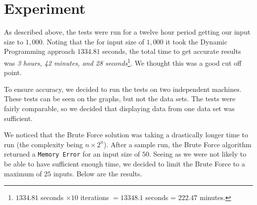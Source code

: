 \documentclass{article}
\begin{document}
\section{Experiment}
As described above, the tests were run for a twelve hour period getting our input size to $1,000$. Noting that the for input size of $1,000$ it took the Dynamic Programming approach $1334.81$ seconds, the total time to get accurate results was \textit{3 hours, 42 minutes, and 28 seconds}\footnote{$1334.81$ seconds $\times 10$ iterations $= 13348.1$ seconds = $222.47$ minutes.}. We thought this was a good cut off point.

To ensure accuracy, we decided to run the tests on two independent machines. These tests can be seen on the graphs, but not the data sets. The tests were fairly comparable, so we decided that displaying data from one data set was sufficient.

We noticed that the Brute Force solution was taking a drastically longer time to run (the complexity being $n \times 2^n$). After a sample run, the Brute Force algorithm returned a \texttt{Memory Error} for an input size of $50$. Seeing as we were not likely to be able to have sufficient enough time, we decided to limit the Brute Force to a maximum of $25$ inputs. Below are the results.
\end{document}
